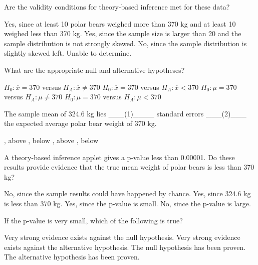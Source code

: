 \documentclass{article}
\begin{document}
\begin{mcquestions}
		\question Are the validity conditions for theory-based inference met for these data?
		\begin{mcanswerslist}
			\answer Yes, since at least 10 polar bears weighed more than 370 kg and at least 10 weighed less than 370 kg.
			\answer[correct] Yes, since the sample size is larger than 20 and the sample distribution is not strongly skewed.
			\answer No, since the sample distribution is slightly skewed left.
			\answer Unable to determine.
		\end{mcanswerslist}
		
		\question[follow] What are the appropriate null and alternative hypotheses?
		\begin{mcanswerslist}
			\answer $H_0:\overline x = 370$ versus $H_A:\overline x \neq 370$
			\answer  $H_0:\overline x = 370$ versus $H_A:\overline x < 370$
			\answer[correct]  $H_0:\mu = 370$ versus $H_A:\mu \neq 370$
			\answer  $H_0:\mu = 370$ versus $H_A:\mu < 370$		
		\end{mcanswerslist}
		
		\question[follow] The sample mean of 324.6 kg lies \_\_\_(1)\_\_\_\_ standard errors \_\_\_(2)\_\_\_ the expected average polar bear weight of 370 kg.
		\begin{mcanswerslist}
			\answer 4.68, above
			\answer[correct] 4.68, below
			\answer 0.51, above
			\answer 0.51, below
		\end{mcanswerslist}
		
		\question[follow] A theory-based inference applet gives a p-value less than 0.00001. Do these results provide evidence that the true mean weight of polar bears is less than 370 kg?
		\begin{mcanswerslist}
			\answer No, since the sample results could have happened by chance.
			\answer Yes, since 324.6 kg is less than 370 kg.
			\answer[correct] Yes, since the p-value is small.
			\answer No, since the p-value is large.
		\end{mcanswerslist}
		
		\question If the p-value is very small, which of the following is true?
		\begin{mcanswerslist}
			\answer[correct] Very strong evidence exists against the null hypothesis.
			\answer Very strong evidence exists against the alternative hypothesis.
			\answer The null hypothesis has been proven.
			\answer The alternative hypothesis has been proven.
		\end{mcanswerslist}
		
	\end{mcquestions}
\end{document}

